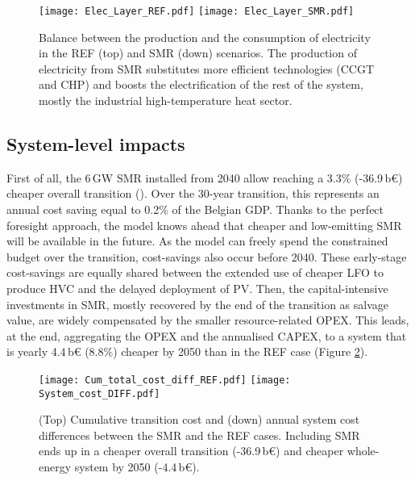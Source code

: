 \begin{figure}[htbp!]
\centering
\texttt{[image: Elec\_Layer\_REF.pdf]}
\texttt{[image: Elec\_Layer\_SMR.pdf]}
\caption{Balance between the production and the consumption of electricity in the REF (top) and SMR (down) scenarios. The production of electricity from \gls{SMR} substitutes more efficient technologies (\ie \gls{CCGT} and \gls{CHP}) and boosts the electrification of the rest of the system, mostly the industrial high-temperature heat sector.}
\label{fig:results_deter_layer_elec}
\end{figure}

\newpage
\subsection{System-level impacts}
\label{subsec:atom_mol:results_deter_overall}
First of all, the 6\,GW \gls{SMR} installed from 2040 allow reaching a 3.3\% (-36.9\,b€) cheaper overall transition (). Over the 30-year transition, this represents an annual cost saving equal to 0.2\% of the Belgian GDP. Thanks to the perfect foresight approach, the model knows ahead that cheaper and low-emitting \gls{SMR} will be available in the future. As the model can freely spend the constrained  budget over the transition, cost-savings also occur before 2040. These early-stage cost-savings are equally shared between the extended use of cheaper \gls{LFO} to produce \gls{HVC} and the delayed deployment of \gls{PV}. Then, the capital-intensive investments in \gls{SMR}, mostly recovered by the end of the transition as salvage value, are widely compensated by the smaller resource-related OPEX. This leads, at the end, aggregating the OPEX and the annualised CAPEX, to a system that is yearly 4.4\,b€ (8.8\%) cheaper by 2050 than in the REF case (Figure \ref{fig:results_deter_overall_emissions_sector}).

\begin{figure}[htbp!]
\centering
\texttt{[image: Cum\_total\_cost\_diff\_REF.pdf]}
\texttt{[image: System\_cost\_DIFF.pdf]}
\caption{(Top) Cumulative transition cost and (down) annual system cost differences between the SMR and the REF cases. Including \gls{SMR} ends up in a cheaper overall transition (-36.9\,b€) and cheaper whole-energy system by 2050 (-4.4\,b€).}
\label{fig:results_deter_overall_emissions_sector}
\end{figure}

